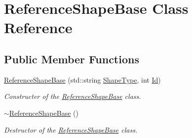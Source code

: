 \hypertarget{classReferenceShapeBase}{}\section{Reference\+Shape\+Base Class Reference}
\label{classReferenceShapeBase}
\subsection*{Public Member Functions}
\begin{DoxyCompactItemize}
\item 
\hypertarget{classReferenceShapeBase_ad2dc1fc69d86a6bf6dd6d07a4ce3f039}{}\hyperlink{classReferenceShapeBase_ad2dc1fc69d86a6bf6dd6d07a4ce3f039}{Reference\+Shape\+Base} (std\+::string \hyperlink{classReferenceShapeBase_a4831a54cffbafef4ded26fb8c50566e0}{Shape\+Type}, int \hyperlink{classReferenceShapeBase_af0da93cee3f17800d7aa90b21b1b81c7}{Id})\label{classReferenceShapeBase_ad2dc1fc69d86a6bf6dd6d07a4ce3f039}

\begin{DoxyCompactList}\small\item\em Constructer of the \hyperlink{classReferenceShapeBase}{Reference\+Shape\+Base} class. \end{DoxyCompactList}\item 
\hypertarget{classReferenceShapeBase_addf60ebee57a9d3b0e345b963901e3b5}{}\hyperlink{classReferenceShapeBase_addf60ebee57a9d3b0e345b963901e3b5}{$\sim$\+Reference\+Shape\+Base} ()\label{classReferenceShapeBase_addf60ebee57a9d3b0e345b963901e3b5}

\begin{DoxyCompactList}\small\item\em Destructor of the \hyperlink{classReferenceShapeBase}{Reference\+Shape\+Base} class. \end{DoxyCompactList}\end{DoxyCompactItemize}
